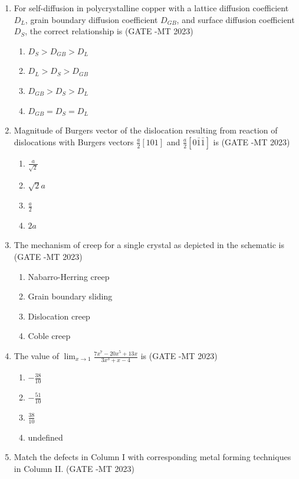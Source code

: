 \documentclass[12pt]{article}
\begin{document}
\begin{enumerate}
\item For self-diffusion in polycrystalline copper with a lattice diffusion coefficient \(D_L\), grain boundary diffusion coefficient \(D_{GB}\), and surface diffusion coefficient \(D_S\), the correct relationship is  (GATE -MT 2023)
\begin{enumerate}[label=(\alph*)]
  \item \(D_S > D_{GB} > D_L\)
  \item \(D_L > D_S > D_{GB}\)
  \item \(D_{GB} > D_S > D_L\)
  \item \(D_{GB} = D_S = D_L\)
\end{enumerate}

\item Magnitude of Burgers vector of the dislocation resulting from reaction of dislocations with Burgers vectors \(\frac{a}{2}[101]\) and \(\frac{a}{2}[0\bar{1}\bar{1}]\) is  (GATE -MT 2023)
\begin{enumerate}[label=(\alph*)]
  \item \(\frac{a}{\sqrt{2}}\)
  \item \(\sqrt{2} a\)
  \item \(\frac{a}{2}\)
  \item \(2 a\)
\end{enumerate}

\item The mechanism of creep for a single crystal as depicted in the schematic is  (GATE -MT 2023)
\begin{enumerate}[label=(\alph*)]
  \item Nabarro-Herring creep
  \item Grain boundary sliding
  \item Dislocation creep
  \item Coble creep
\end{enumerate}

\item The value of \(\lim_{x \to 1} \frac{7x^7 - 20 x^5 + 13 x}{3 x^3 + x - 4}\) is  (GATE -MT 2023)
\begin{enumerate}[label=(\alph*)]
  \item \(-\frac{38}{10}\)
  \item \(-\frac{51}{10}\)
  \item \(\frac{38}{10}\)
  \item undefined
\end{enumerate}

\item Match the defects in Column I with corresponding metal forming techniques in Column II.  (GATE -MT 2023)


\end{enumerate}
\end{document}
